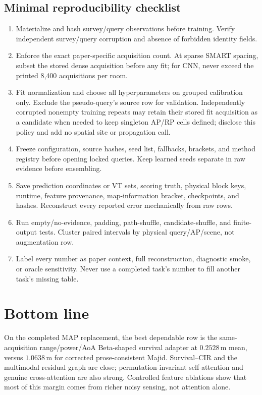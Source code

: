 \documentclass[10pt]{article}
\newcommand{\m}{\,\mathrm m}
\begin{document}
\subsection{Minimal reproducibility checklist}

\begin{enumerate}
\item Materialize and hash survey/query observations before training.  Verify
independent survey/query corruption and absence of forbidden identity fields.
\item Enforce the exact paper-specific acquisition count.  At sparse SMART
spacing, subset the stored dense acquisition before any fit; for CNN, never
exceed the printed 8,400 acquisitions per room.
\item Fit normalization and choose all hyperparameters on grouped calibration
only.  Exclude the pseudo-query's source row for validation.  Independently
corrupted nonempty training repeats may retain their stored fit acquisition as
a candidate when needed to keep singleton AP/RP cells defined; disclose this
policy and add no spatial site or propagation call.
\item Freeze configuration, source hashes, seed list, fallbacks, brackets, and
method registry before opening locked queries.  Keep learned seeds separate in
raw evidence before ensembling.
\item Save prediction coordinates or VT sets, scoring truth, physical block
keys, runtime, feature provenance, map-information bracket, checkpoints, and
hashes.  Reconstruct every reported error mechanically from raw rows.
\item Run empty/no-evidence, padding, path-shuffle, candidate-shuffle, and
finite-output tests.  Cluster paired intervals by physical query/AP/scene, not
augmentation row.
\item Label every number as paper context, full reconstruction, diagnostic
smoke, or oracle sensitivity.  Never use a completed task's number to fill
another task's missing table.
\end{enumerate}

\section{Bottom line}

On the completed MAP replacement, the best dependable row is the
same-acquisition range/power/AoA Beta-shaped survival adapter at $0.2528\m$
mean, versus $1.0638\m$ for corrected prose-consistent Majid.  Survival--CIR
and the multimodal residual graph are close; permutation-invariant
self-attention and genuine cross-attention are also strong.  Controlled
feature ablations show that most of this margin comes from richer noisy sensing,
not attention alone.
\end{document}
